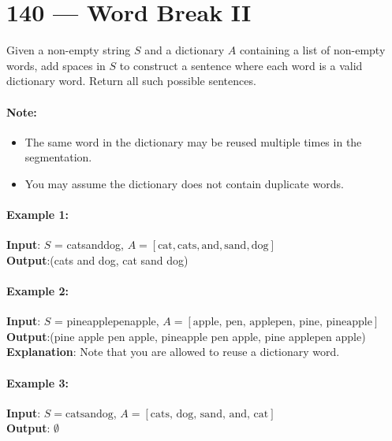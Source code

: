 \section{140 --- Word Break II}
Given a non-empty string $S$ and a dictionary $A$ containing a list of non-empty words, add spaces in $S$ to construct a sentence where each word is a valid dictionary word. Return all such possible sentences.
\paragraph{Note:}
\begin{itemize}
\item The same word in the dictionary may be reused multiple times in the segmentation.
\item You may assume the dictionary does not contain duplicate words.
\end{itemize}
\paragraph{Example 1:}
\begin{flushleft}
\textbf{Input}: $S$ = catsanddog, $A = [\text{cat}, \text{cats}, \text{and}, \text{sand}, \text{dog}]$
\\
\textbf{Output}:(cats and dog, cat sand dog)
\end{flushleft}
\paragraph{Example 2:}
\begin{flushleft}
\textbf{Input}: $S$ = pineapplepenapple, $A= [\text{apple, pen, applepen, pine, pineapple}]$
\\
\textbf{Output}:(pine apple pen apple, pineapple pen apple, pine applepen apple)
\\
\textbf{Explanation}: Note that you are allowed to reuse a dictionary word.
\end{flushleft}
\paragraph{Example 3:}
\begin{flushleft}
\textbf{Input}: $S = \text{catsandog}$, $A = [\text{cats, dog, sand, and, cat}]$
\\
\textbf{Output}: $\emptyset$
\end{flushleft}
